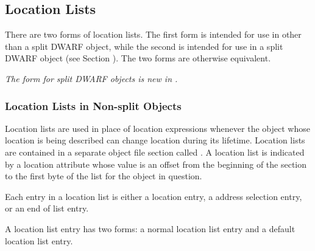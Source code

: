 \subsection{Location Lists}
\label{chap:locationlists}
There are two forms of location lists. The first form 
is intended for use in other than a split DWARF object,
while the second is intended for use in a split DWARF object
(see Section ). The two
forms are otherwise equivalent.

\textit{The form for split DWARF objects is new in \DWARFVersionV.}

\subsubsection{Location Lists in Non-split Objects}
\label{chap:locationlistsinnonsplitobjects}
Location lists 
are used in place of location expressions
whenever the object whose location is being described
can change location during its lifetime. 
Location lists
are contained in a separate object file section called
\dotdebugloc{}. A location list is indicated by a location
attribute whose value is an offset from the beginning of
the \dotdebugloc{} section to the first byte of the list for the
object in question.

Each entry in a location list is either a location 
entry,
a 
address selection entry, 
or an 
end of list entry.

A location list entry has two forms:
a normal location list entry and a default location list entry.

